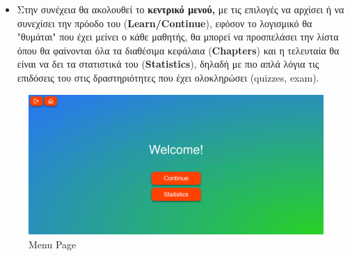 \begin{itemize}
    \item Στην συνέχεια θα ακολουθεί το \textbf{κεντρικό μενού,} με τις επιλογές να αρχίσει ή να συνεχίσει την πρόοδο του (\textbf{\textlatin{Learn/Continue}}), εφόσον το λογισμικό θα "θυμάται" που έχει μείνει ο κάθε μαθητής, θα μπορεί να προσπελάσει την λίστα όπου θα φαίνονται όλα τα διαθέσιμα κεφάλαια (\textlatin{\textbf{Chapters}}) και η τελευταία θα είναι να δει τα στατιστικά του (\textbf{\textlatin{Statistics}}), δηλαδή με πιο απλά λόγια τις επιδόσεις του στις δραστηριότητες που έχει ολοκληρώσει (\textlatin{quizzes, exam}).
\end{itemize}
\begin{figure}[H]
    \centering
    \includegraphics[width=1\linewidth]{img/Menu.png}
    \caption{\textlatin{Menu Page}}
\end{figure}

